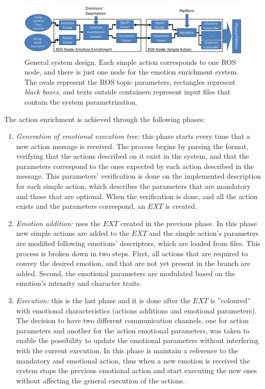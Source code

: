 \begin{figure}
	\centering
	\includegraphics[width=1.0\textwidth]{Images/SystemArchitecture.png} 	
	\caption{General system design. Each simple action corresponds to one ROS node, and there is just one node for the emotion enrichment system. The ovals represent the ROS topic parameters, rectangles represent \textit{black boxes}, and texts outside containers represent input files that contain the system parametrization.}
	\label{fig:system_architecture}
\end{figure}

The action enrichment is achieved through the following phases:
\begin{enumerate}

	\item \textit{Generation of emotional execution tree:} this phase starts every time that a new action message is received. The process begins by parsing the format, verifying that the actions described on it exist in the system, and that the parameters correspond to the ones expected by each action described in the message. This parameters' verification is done on the implemented description for each simple action, which describes the parameters that are mandatory and those that are optional. When the verification is done, and all the action exists and  the parameters correspond, an $EXT$ is created.

	\item \textit{Emotion addition:} uses the $EXT$ created in the previous phase. In this phase new simple actions are added to the $EXT$ and the simple action's parameters are modified following emotions' descriptors, which are loaded from files. This process is broken down in two steps. First, all actions that are required to convey the desired emotion, and that are not yet present in the branch are added. Second, the emotional parameters are modulated based on the emotion's intensity and character traits.

	\item \textit{Execution:} this is the last phase and it is done after the $EXT$ is ''coloured'' with emotional characteristics (actions additions and emotional parameters). The decision to have two different communication channels, one for action parameters and another for the action emotional parameters, was taken to enable the possibility to update the emotional parameters without interfering with the current execution. In this phase is maintain a reference to the mandatory and emotional action, thus when a new emotion is received the system stops the previous emotional action and start executing the new ones without affecting the general execution of the actions.

\end{enumerate}